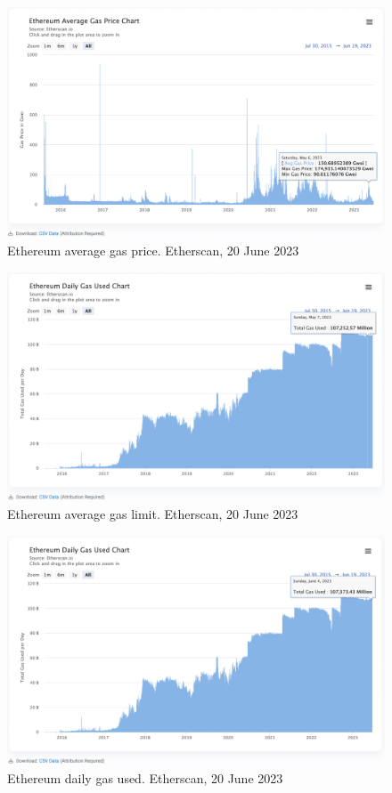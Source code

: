 \documentclass[UTF8]{article}
\begin{document}
\begin{figure}[htbp]
\begin{center}
\includegraphics[width=0.9\linewidth]{images/ethavgas}
\caption{Ethereum average gas price. Etherscan, 20 June 2023}
\label{fig:ethavgas}
\end{center}
\end{figure}

\begin{figure}[htbp]
\begin{center}
\includegraphics[width=0.9\linewidth]{images/ethgaslim}
\caption{Ethereum average gas limit. Etherscan, 20 June 2023}
\label{fig:ethgaslim}
\end{center}
\end{figure}

\begin{figure}[htbp]
\begin{center}
\includegraphics[width=0.9\linewidth]{images/ethgasused}
\caption{Ethereum daily gas used. Etherscan, 20 June 2023}
\label{fig:ethgasused}
\end{center}
\end{figure}
\end{document}
